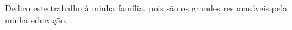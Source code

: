
\begin{epigrafe}[Dedicatória]

Dedico este trabalho à minha família, pois são os grandes responsáveis pela minha educação.

\end{epigrafe}